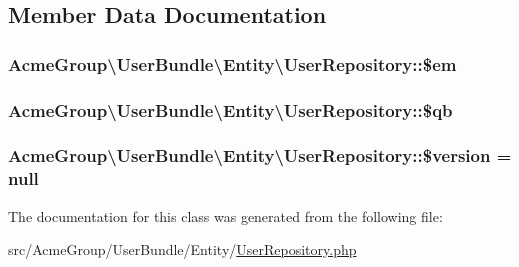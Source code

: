 \subsection{Member Data Documentation}
\hypertarget{class_acme_group_1_1_user_bundle_1_1_entity_1_1_user_repository_ad4b9fcee87714596046edad1d1775206}{
\subsubsection[{\$em}]{\setlength{\rightskip}{0pt plus 5cm}Acme\+Group\textbackslash{}\+User\+Bundle\textbackslash{}\+Entity\textbackslash{}\+User\+Repository\+::\$em\hspace{0.3cm}{\ttfamily [protected]}}}\label{class_acme_group_1_1_user_bundle_1_1_entity_1_1_user_repository_ad4b9fcee87714596046edad1d1775206}
\hypertarget{class_acme_group_1_1_user_bundle_1_1_entity_1_1_user_repository_acf15894ed2f0953ab901e9cbbef67454}{
\subsubsection[{\$qb}]{\setlength{\rightskip}{0pt plus 5cm}Acme\+Group\textbackslash{}\+User\+Bundle\textbackslash{}\+Entity\textbackslash{}\+User\+Repository\+::\$qb\hspace{0.3cm}{\ttfamily [protected]}}}\label{class_acme_group_1_1_user_bundle_1_1_entity_1_1_user_repository_acf15894ed2f0953ab901e9cbbef67454}
\hypertarget{class_acme_group_1_1_user_bundle_1_1_entity_1_1_user_repository_aa97ff764be6249b8dfc58586e97a3367}{
\subsubsection[{\$version}]{\setlength{\rightskip}{0pt plus 5cm}Acme\+Group\textbackslash{}\+User\+Bundle\textbackslash{}\+Entity\textbackslash{}\+User\+Repository\+::\$version = {\bf null}\hspace{0.3cm}{\ttfamily [protected]}}}\label{class_acme_group_1_1_user_bundle_1_1_entity_1_1_user_repository_aa97ff764be6249b8dfc58586e97a3367}


The documentation for this class was generated from the following file\+:\begin{DoxyCompactItemize}
\item 
src/\+Acme\+Group/\+User\+Bundle/\+Entity/\hyperlink{_user_repository_8php}{User\+Repository.\+php}\end{DoxyCompactItemize}
